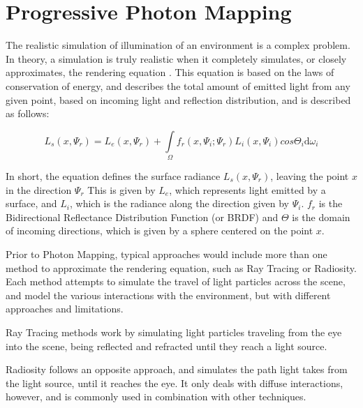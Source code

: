 \section{Progressive Photon Mapping}
\label{sec:photon}

The realistic simulation of illumination of an environment is a complex problem. In theory, a simulation is truly realistic when it completely simulates, or closely approximates, the rendering equation \cite{kajiya1986rendering}. This equation is based on the laws of conservation of energy, and describes the total amount of emitted light from any given point, based on incoming light and reflection distribution, and is described as follows:

\begin{figure}[!htp]
  \begin{equation}
    L_s(x, \Psi_r) = L_e(x, \Psi_r) + \int\limits_\Omega f_r(x, \Psi_i; \Psi_r) L_i(x, \Psi_i) cos\Theta_i \mathrm{d}\omega_i
  \end{equation}
  \label{eq:render}
\end{figure}

In short, the equation defines the surface radiance $L_s(x, \Psi_r)$, leaving the point $x$ in the direction $\Psi_r$ 
This is given by $L_e$, which represents light emitted by a surface, and $L_i$, which is the radiance along the direction given by $\Psi_i$. $f_r$ is the Bidirectional Reflectance Distribution Function (or BRDF) and $\Theta$ is the domain of incoming directions, which is given by a sphere centered on the point $x$. 

Prior to Photon Mapping, typical approaches would include more than one method to approximate the rendering equation, such as Ray Tracing or Radiosity. Each method attempts to simulate the travel of light particles across the scene, and model the various interactions with the environment, but with different approaches and limitations.

Ray Tracing methods work by simulating light particles traveling from the eye into the scene, being reflected and refracted until they reach a light source. 

Radiosity follows an opposite approach, and simulates the path light takes from the light source, until it reaches the eye. It only deals with diffuse interactions, however, and is commonly used in combination with other techniques.

